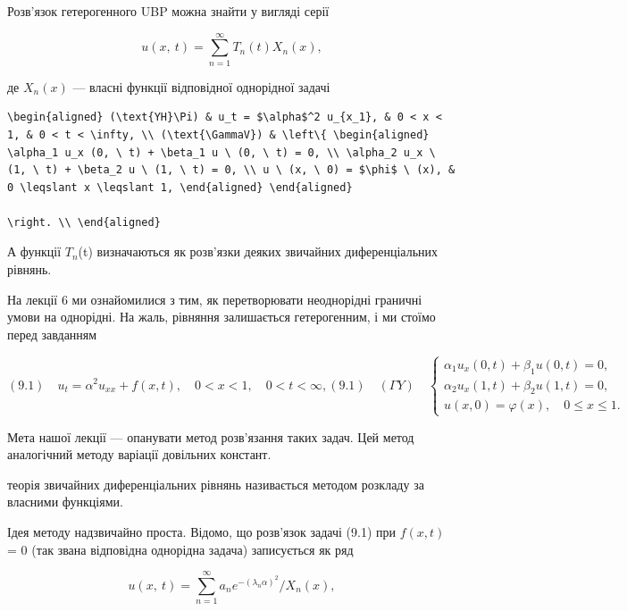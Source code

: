 \documentclass[
  ukrainian,
]{article}
\begin{document}
Розв'язок гетерогенного UBP можна знайти у вигляді серії

\[
u\left( x,\ t\right) =\sum_{n=1}^{\infty}T_{n}\left( t\right) X_{n}\left( x\right) ,
\]

де \(X_n\left(x\right)\) --- власні функції відповідної однорідної
задачі

\begin{verbatim}
\begin{aligned} (\text{YH}\Pi) & u_t = $\alpha$^2 u_{x_1}, & 0 < x < 1, & 0 < t < \infty, \\ (\text{\GammaV}) & \left\{ \begin{aligned} \alpha_1 u_x (0, \ t) + \beta_1 u \ (0, \ t) = 0, \\ \alpha_2 u_x \ (1, \ t) + \beta_2 u \ (1, \ t) = 0, \\ u \ (x, \ 0) = $\phi$ \ (x), & 0 \leqslant x \leqslant 1, \end{aligned} \end{aligned}

\right. \\ \end{aligned}
\end{verbatim}

А функції \(T_n\)(t) визначаються як розв'язки деяких звичайних
диференціальних рівнянь.

На лекції 6 ми ознайомилися з тим, як перетворювати неоднорідні граничні
умови на однорідні. На жаль, рівняння залишається гетерогенним, і ми
стоїмо перед завданням

\[
(9.1) \quad u_{t} = \alpha^{2} u_{xx} + f(x, t), \quad 0 < x < 1, \quad 0 < t < \infty,
(9.1) \quad (\Gamma Y) \quad
\begin{cases} \alpha_{1} u_{x}(0, t) + \beta_{1} u(0, t) = 0, \\ \alpha_{2} u_{x}(1, t) + \beta_{2} u(1, t) = 0, \\ u(x, 0) = \varphi(x), \quad 0 \le x \le 1. \end{cases}
\]

Мета нашої лекції --- опанувати метод розв'язання таких задач. Цей метод
аналогічний методу варіації довільних констант.

теорія звичайних диференціальних рівнянь називається методом розкладу за
власними функціями.

Ідея методу надзвичайно проста. Відомо, що розв'язок задачі (9.1) при
\(f(x, t)\) = 0 (так звана відповідна однорідна задача) записується як
ряд

\[
u\left(x,\ t\right)=\sum_{n=1}^{\infty}a_{n}e^{-\left(\lambda_{n}\alpha\right)^{2}}/X_{n}\left(x\right),
\]
\end{document}
